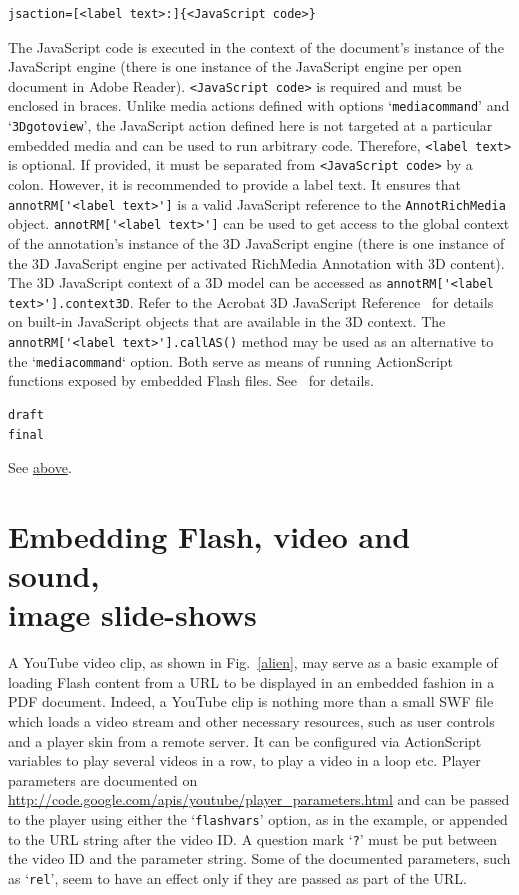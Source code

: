 \documentclass[a4paper]{article}
\begin{document}
\begin{verbatim}
jsaction=[<label text>:]{<JavaScript code>}
\end{verbatim}
The JavaScript code is executed in the context of the document's instance of the JavaScript engine (there is one instance of the JavaScript engine per open document in Adobe Reader). \verb+<JavaScript code>+ is required and must be enclosed in braces. Unlike media actions defined with options `\verb+mediacommand+' and `\verb+3Dgotoview+', the JavaScript action defined here is not targeted at a particular embedded media and can be used to run arbitrary code. Therefore, \verb+<label text>+ is optional. If provided, it must be separated from \verb+<JavaScript code>+ by a colon. However, it is recommended to provide a label text. It ensures that \verb+annotRM['<label text>']+ is a valid JavaScript reference to the \verb+AnnotRichMedia+ object. \verb+annotRM['<label text>']+ can be used to get access to the global context of the annotation's instance of the 3D JavaScript engine (there is one instance of the 3D JavaScript engine per activated RichMedia Annotation with 3D content). The 3D JavaScript context of a 3D model can be accessed as \verb+annotRM['<label text>'].context3D+. Refer to the Acrobat 3D JavaScript Reference~\cite{jscript3D} for details on built-in JavaScript objects that are available in the 3D context. The \verb+annotRM['<label text>'].callAS()+ method may be used as an alternative to the `\verb+mediacommand+` option. Both serve as means of running ActionScript functions exposed by embedded Flash files. See~\cite{jscript} for details.
\begin{verbatim}
draft
final
\end{verbatim}
See \hyperlink{draftfinal}{above}.

\clearpage
\section[Embedding Flash, video and sound, image slide-shows (with examples)]{Embedding Flash, video and sound,\\ image slide-shows}
A YouTube video clip, as shown in Fig.~\ref{alien}, may serve as a basic example of loading Flash content from a URL to be displayed in an embedded fashion in a PDF document. Indeed, a YouTube clip is nothing more than a small SWF file which loads a video stream and other necessary resources, such as user controls and a player skin from a remote server. It can be configured via ActionScript variables to play several videos in a row, to play a video in a loop etc. Player parameters are documented on \url{http://code.google.com/apis/youtube/player_parameters.html} and can be passed to the player using either the `\verb+flashvars+' option, as in the example, or appended to the URL string after the video ID. A question mark `\verb+?+' must be put between the video ID and the parameter string. Some of the documented parameters, such as `\verb+rel+', seem to have an effect only if they are passed as part of the URL.
\end{document}
